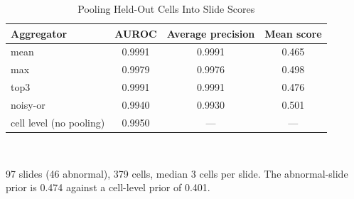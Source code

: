 \begin{table}[!htbp]
\caption{Pooling Held-Out Cells Into Slide Scores}
\label{tab:sslide}
\centering\footnotesize
\begin{tabular}{@{}lccc@{}}
\toprule
Aggregator & AUROC & Average precision & Mean score \\
\midrule
mean & 0.9991 & 0.9991 & 0.465 \\
max & 0.9979 & 0.9976 & 0.498 \\
top3 & 0.9991 & 0.9991 & 0.476 \\
noisy-or & 0.9940 & 0.9930 & 0.501 \\
\midrule cell level (no pooling) & 0.9950 & --- & --- \\
\bottomrule
\end{tabular}
\\[2pt]\begin{minipage}{\textwidth}\scriptsize 97 slides (46 abnormal), 379 cells, median 3 cells per slide. The abnormal-slide prior is 0.474 against a cell-level prior of 0.401.\end{minipage}
\end{table}
